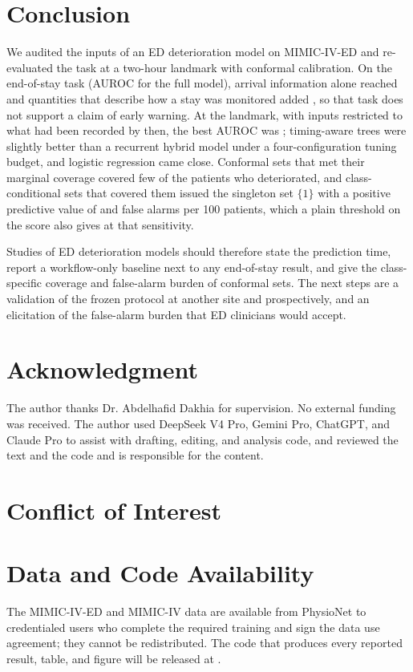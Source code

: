 \section{Conclusion}
\label{sec:conclusion}

We audited the inputs of an ED deterioration model on MIMIC-IV-ED and re-evaluated the task at a two-hour landmark with conformal calibration. On the end-of-stay task (AUROC \RVEosHybridAuroc{} for the full model), arrival information alone reached \RVIncArr{} and quantities that describe how a stay was monitored added \RVIncWorkOverArr{}, so that task does not support a claim of early warning. At the landmark, with inputs restricted to what had been recorded by then, the best AUROC was \RVAurocXgbT{}; timing-aware trees were slightly better than a recurrent hybrid model under a four-configuration tuning budget, and logistic regression came close. Conformal sets that met their marginal coverage covered few of the patients who deteriorated, and class-conditional sets that covered them issued the singleton set $\{1\}$ with a positive predictive value of \RVSetPpvMondEci{} and \RVSetFaMondEci{} false alarms per 100 patients, which a plain threshold on the score also gives at that sensitivity.

Studies of ED deterioration models should therefore state the prediction time, report a workflow-only baseline next to any end-of-stay result, and give the class-specific coverage and false-alarm burden of conformal sets. The next steps are a validation of the frozen protocol at another site and prospectively, and an elicitation of the false-alarm burden that ED clinicians would accept.

\section*{Acknowledgment}
The author thanks Dr. Abdelhafid Dakhia for supervision. No external funding was received. The author used DeepSeek V4 Pro, Gemini Pro, ChatGPT, and Claude Pro to assist with drafting, editing, and analysis code, and reviewed the text and the code and is responsible for the content.

\section*{Conflict of Interest}

\section*{Data and Code Availability}
The MIMIC-IV-ED and MIMIC-IV data are available from PhysioNet to credentialed users who complete the
required training and sign the data use agreement; they cannot be redistributed. The code that produces
every reported result, table, and figure will be released at .
